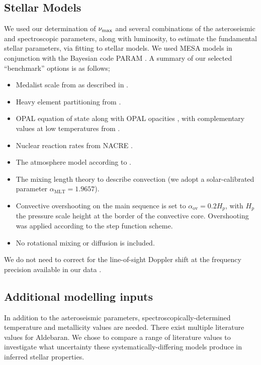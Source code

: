 \documentclass[modern]{aastex61}
\newcommand{\numax}{\mbox{$\nu_{\rm max}$}\xspace}
\begin{document}
\subsection{Stellar Models}\label{sec:stell_mod}
We used our determination of \numax and several combinations of the asteroseismic and spectroscopic parameters, along with luminosity, to estimate the fundamental stellar parameters, via fitting to stellar models. We used \textsc{MESA} models \citep{2011Paxton,2013Paxton} in conjunction with the Bayesian code \textsc{PARAM} \citep{2006dasilva, 2017Rod}.  A summary of our selected ``benchmark'' options is as follows;
\begin{itemize}%
\item Medalist scale from \citet{Grevesse93} as described in \citet{2017Rod}.
\item Heavy element partitioning from \cite{1993Grevesse}.
\item OPAL equation of state \citep{2002Rogers} along with OPAL opacities \citep{1996Iglesias}, with complementary values at low temperatures from \cite{2005Ferguson}.
\item Nuclear reaction rates from NACRE \citep{1999Angulo}.
\item The atmosphere model according to \cite{1966Kris}.
\item The mixing length theory to describe convection (we adopt a solar-calibrated parameter $\alpha_{\textrm{MLT}} =1.9657$).
\item Convective overshooting on the main sequence is set to $\alpha_{\textrm{ov}}=0.2H_{p}$, with $H_{p}$ the pressure scale height at the border of the convective core. Overshooting was applied according to the \cite{1975Maeder} step function
scheme.
\item No rotational mixing or diffusion is included.
\end{itemize}
We do not need to correct for the line-of-sight Doppler shift at the frequency precision available in our data \citep{2014MNRAS.445L..94D}.
\subsection{Additional modelling inputs}\label{sec:addmod}
In addition to the asteroseismic parameters, spectroscopically-determined temperature and metallicity values are needed. There exist multiple literature values for Aldebaran. We chose to compare a range of literature values to investigate what uncertainty these systematically-differing models produce in inferred stellar properties.
\end{document}
